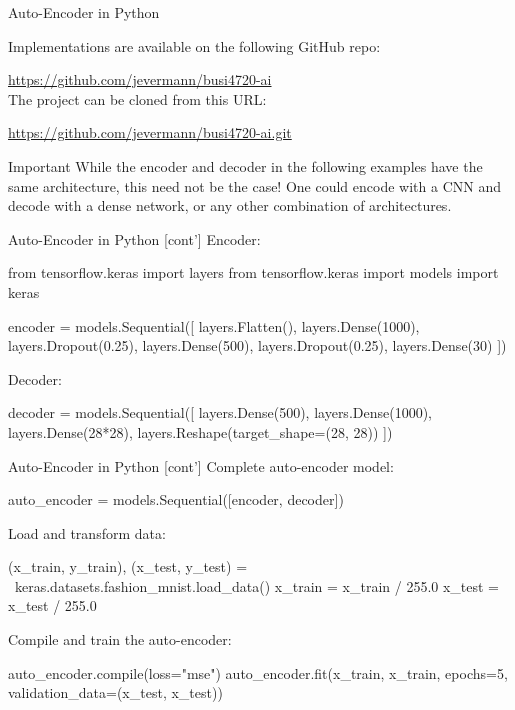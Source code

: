 \documentclass[ignorenonframetext,xcolor=x11names]{beamer}
\begin{document}
\begin{frame}[label=withcode]{Auto-Encoder in Python}

Implementations are available on the following GitHub repo:

\url{https://github.com/jevermann/busi4720-ai} \\


The project can be cloned from this URL:

\url{https://github.com/jevermann/busi4720-ai.git}

\begin{block}{Important}
While the encoder and decoder in the following examples have the same architecture, this need not be the case! One could encode with a CNN and decode with a dense network, or any other combination of architectures.
\end{block}

\end{frame}

\begin{frame}[label=withcode,fragile]{Auto-Encoder in Python \small [cont']}
Encoder:
\begin{pythoncode}
from tensorflow.keras import layers
from tensorflow.keras import models
import keras

encoder = models.Sequential([
    layers.Flatten(),
    layers.Dense(1000),
    layers.Dropout(0.25),
    layers.Dense(500),
    layers.Dropout(0.25),
    layers.Dense(30)
])
\end{pythoncode}
Decoder:
\begin{pythoncode}
decoder = models.Sequential([
    layers.Dense(500),
    layers.Dense(1000),
    layers.Dense(28*28),
    layers.Reshape(target_shape=(28, 28))
])
\end{pythoncode}
\end{frame}

\begin{frame}[label=withcode,fragile]{Auto-Encoder in Python \small [cont']}
Complete auto-encoder model:

\begin{pythoncode}
auto_encoder = models.Sequential([encoder, decoder])
\end{pythoncode}

Load and transform data:
\begin{pythoncode}
(x_train, y_train), (x_test, y_test) = \
                    keras.datasets.fashion_mnist.load_data()
x_train = x_train / 255.0
x_test = x_test / 255.0
\end{pythoncode}

Compile and train the auto-encoder:
\begin{pythoncode}
auto_encoder.compile(loss="mse")
auto_encoder.fit(x_train, x_train, 
                 epochs=5, validation_data=(x_test, x_test))
\end{pythoncode}
\end{frame}
\end{document}
